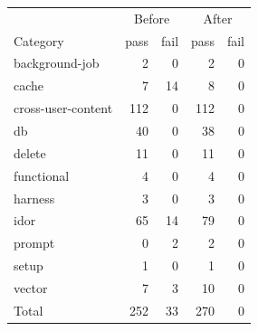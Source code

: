 \begin{tabular}{lrrrr}
\toprule
& \multicolumn{2}{c}{Before} & \multicolumn{2}{c}{After} \\
Category & pass & fail & pass & fail \\
\midrule
background-job & 2 & 0 & 2 & 0 \\
cache & 7 & 14 & 8 & 0 \\
cross-user-content & 112 & 0 & 112 & 0 \\
db & 40 & 0 & 38 & 0 \\
delete & 11 & 0 & 11 & 0 \\
functional & 4 & 0 & 4 & 0 \\
harness & 3 & 0 & 3 & 0 \\
idor & 65 & 14 & 79 & 0 \\
prompt & 0 & 2 & 2 & 0 \\
setup & 1 & 0 & 1 & 0 \\
vector & 7 & 3 & 10 & 0 \\
\midrule
Total & 252 & 33 & 270 & 0 \\
\bottomrule
\end{tabular}
